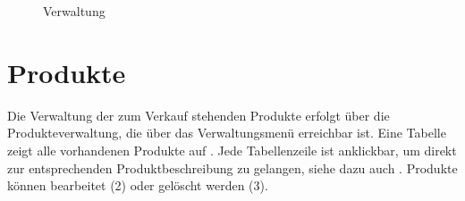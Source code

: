 \begin{figure}[h!]
  \centering
  \caption{Verwaltung}
  \label{fig:Verwaltung}
\end{figure}


\section{Produkte}
\label{chp:Produkte}
Die Verwaltung der zum Verkauf stehenden Produkte erfolgt über die Produkteverwaltung, die über das Verwaltungsmenü erreichbar ist. Eine Tabelle zeigt alle vorhandenen Produkte auf . Jede Tabellenzeile ist anklickbar, um direkt zur entsprechenden Produktbeschreibung zu gelangen, siehe dazu auch . Produkte können bearbeitet (2) oder gelöscht werden (3).

